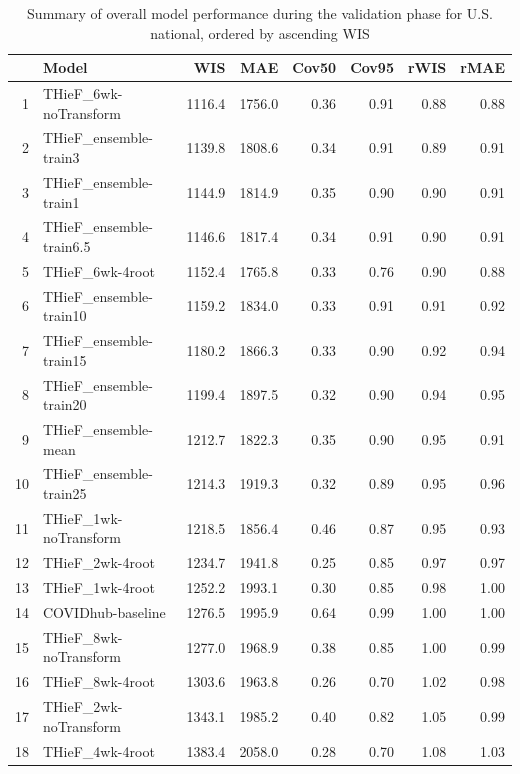\documentclass[thesis]{umassthesis}  %
\begin{document}
\begin{table}%
\begin{center}
\caption{Summary of overall model performance during the validation phase for U.S. national, ordered by ascending WIS}
\label{tab:table_validation_us}
\begin{tabular}{rlrrrrrr}
  \hline
 & Model & WIS & MAE & Cov50 & Cov95 & rWIS & rMAE \\ 
  \hline
1 & THieF\_6wk-noTransform & 1116.4 & 1756.0 & 0.36 & 0.91 & 0.88 & 0.88 \\ 
  2 & THieF\_ensemble-train3 & 1139.8 & 1808.6 & 0.34 & 0.91 & 0.89 & 0.91 \\ 
  3 & THieF\_ensemble-train1 & 1144.9 & 1814.9 & 0.35 & 0.90 & 0.90 & 0.91 \\ 
  4 & THieF\_ensemble-train6.5 & 1146.6 & 1817.4 & 0.34 & 0.91 & 0.90 & 0.91 \\ 
  5 & THieF\_6wk-4root & 1152.4 & 1765.8 & 0.33 & 0.76 & 0.90 & 0.88 \\ 
  6 & THieF\_ensemble-train10 & 1159.2 & 1834.0 & 0.33 & 0.91 & 0.91 & 0.92 \\ 
  7 & THieF\_ensemble-train15 & 1180.2 & 1866.3 & 0.33 & 0.90 & 0.92 & 0.94 \\ 
  8 & THieF\_ensemble-train20 & 1199.4 & 1897.5 & 0.32 & 0.90 & 0.94 & 0.95 \\ 
  9 & THieF\_ensemble-mean & 1212.7 & 1822.3 & 0.35 & 0.90 & 0.95 & 0.91 \\ 
  10 & THieF\_ensemble-train25 & 1214.3 & 1919.3 & 0.32 & 0.89 & 0.95 & 0.96 \\ 
  11 & THieF\_1wk-noTransform & 1218.5 & 1856.4 & 0.46 & 0.87 & 0.95 & 0.93 \\ 
  12 & THieF\_2wk-4root & 1234.7 & 1941.8 & 0.25 & 0.85 & 0.97 & 0.97 \\ 
  13 & THieF\_1wk-4root & 1252.2 & 1993.1 & 0.30 & 0.85 & 0.98 & 1.00 \\ 
  14 & COVIDhub-baseline & 1276.5 & 1995.9 & 0.64 & 0.99 & 1.00 & 1.00 \\ 
  15 & THieF\_8wk-noTransform & 1277.0 & 1968.9 & 0.38 & 0.85 & 1.00 & 0.99 \\ 
  16 & THieF\_8wk-4root & 1303.6 & 1963.8 & 0.26 & 0.70 & 1.02 & 0.98 \\ 
  17 & THieF\_2wk-noTransform & 1343.1 & 1985.2 & 0.40 & 0.82 & 1.05 & 0.99 \\ 
  18 & THieF\_4wk-4root & 1383.4 & 2058.0 & 0.28 & 0.70 & 1.08 & 1.03 \\ 

\end{tabular}
\end{center}
\end{table}
\end{document}
